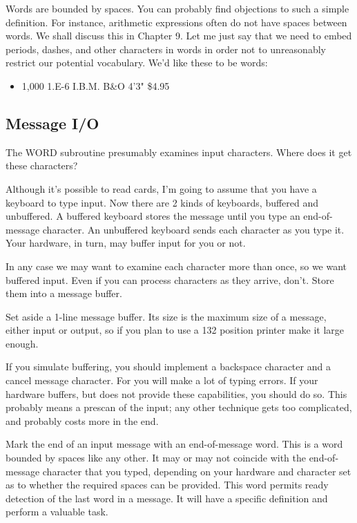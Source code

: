 \documentclass[b5paper, oneside]{book}
\begin{document}
Words are bounded by spaces. You can probably find objections to such a simple definition. For instance, arithmetic expressions often do not have spaces between words. We shall discuss this in Chapter 9. Let me just say that we need to embed periods, dashes, and other characters in words in order not to unreasonably restrict our potential vocabulary. We'd like these to be words:\begin{itemize}
   \item 1,000 1.E-6 I.B.M. B\&O 4'3" \$4.95\end{itemize}

\subsection{Message I/O}
The WORD subroutine presumably examines input characters. Where does it get these characters?

Although it's possible to read cards, I'm going to assume that you have a keyboard to type input. Now there are 2 kinds of keyboards, buffered and unbuffered. A buffered keyboard stores the message until you type an end-of-message character. An unbuffered keyboard sends each character as you type it. Your hardware, in turn, may buffer input for you or not.

In any case we may want to examine each character more than once, so we want buffered input. Even if you can process characters as they arrive, don't. Store them into a message buffer.

Set aside a 1-line message buffer. Its size is the maximum size of a message, either input or output, so if you plan to use a 132 position printer make it large enough.

If you simulate buffering, you should implement a backspace character and a cancel message character. For you will make a lot of typing errors. If your hardware buffers, but does not provide these capabilities, you should do so. This probably means a prescan of the input; any other technique gets too complicated, and probably costs more in the end.

Mark the end of an input message with an end-of-message word. This is a word bounded by spaces like any other. It may or may not coincide with the end-of-message character that you typed, depending on your hardware and character set as to whether the required spaces can be provided. This word permits ready detection of the last word in a message. It will have a specific definition and perform a valuable task.
\end{document}
